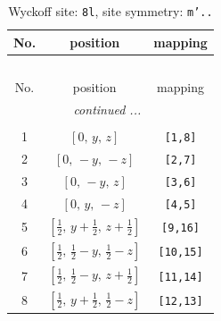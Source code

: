 \documentclass[fleqn,8pt]{jsarticle}
\begin{document}
\begin{longtable}{ccc}
\caption{Wyckoff site: {\tt 8l}, site symmetry: {\tt m'..}}
 \\
 \hline \hline
No. & position & mapping \\ \hline \endfirsthead

\multicolumn{2}{l}{\tablename\ \thetable{}} \\
 \hline \hline
No. & position & mapping \\ \hline \endhead

 \hline \hline
\multicolumn{2}{r}{\footnotesize\it continued ...} \\ \endfoot

 \hline \hline
\multicolumn{2}{r}{} \\ \endlastfoot

1 & $\left[ 0,\, y,\, z \right]$ & {\tt [1,8]} \\ \hline
2 & $\left[ 0,\, - y,\, - z \right]$ & {\tt [2,7]} \\ \hline
3 & $\left[ 0,\, - y,\, z \right]$ & {\tt [3,6]} \\ \hline
4 & $\left[ 0,\, y,\, - z \right]$ & {\tt [4,5]} \\ \hline
5 & $\left[ \frac{1}{2},\, y + \frac{1}{2},\, z + \frac{1}{2} \right]$ & {\tt [9,16]} \\ \hline
6 & $\left[ \frac{1}{2},\, \frac{1}{2} - y,\, \frac{1}{2} - z \right]$ & {\tt [10,15]} \\ \hline
7 & $\left[ \frac{1}{2},\, \frac{1}{2} - y,\, z + \frac{1}{2} \right]$ & {\tt [11,14]} \\ \hline
8 & $\left[ \frac{1}{2},\, y + \frac{1}{2},\, \frac{1}{2} - z \right]$ & {\tt [12,13]} \\
\end{longtable}
\renewcommand{\arraystretch}{1.2}
\end{document}

